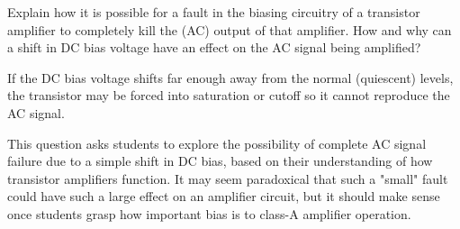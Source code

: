 

Explain how it is possible for a fault in the biasing circuitry of a transistor amplifier to completely kill the (AC) output of that amplifier.  How and why can a shift in DC bias voltage have an effect on the AC signal being amplified?







If the DC bias voltage shifts far enough away from the normal (quiescent) levels, the transistor may be forced into saturation or cutoff so it cannot reproduce the AC signal.







This question asks students to explore the possibility of complete AC signal failure due to a simple shift in DC bias, based on their understanding of how transistor amplifiers function.  It may seem paradoxical that such a "small" fault could have such a large effect on an amplifier circuit, but it should make sense once students grasp how important bias is to class-A amplifier operation.




